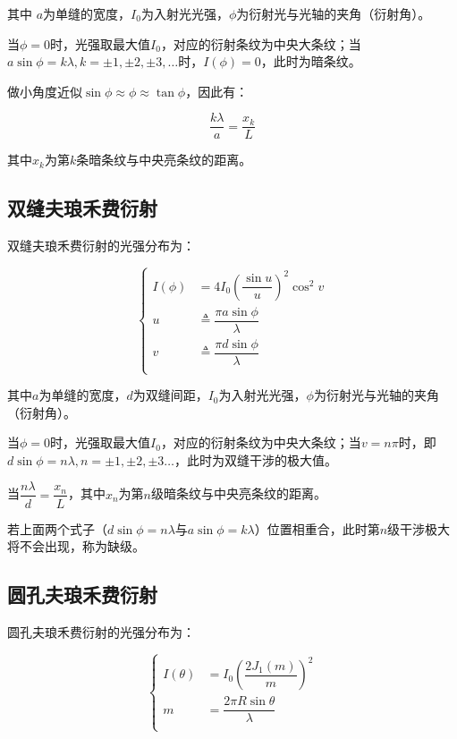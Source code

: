 \documentclass[a4paper]{ltxdoc}
\begin{document}
\begin{multicols}{2}
    其中 $a$为单缝的宽度，$I_0$为入射光光强，$\phi$为衍射光与光轴的夹角（衍射角）。

    当$\phi = 0$时，光强取最大值$I_0$，对应的衍射条纹为中央大条纹；当$a\sin\phi=k\lambda,k=\pm 1,\pm 2,\pm 3,\ldots$时，$I(\phi)=0$，此时为暗条纹。

    做小角度近似$\sin\phi\approx\phi\approx\tan\phi$，因此有：

    $$
        \dfrac{k\lambda}{a} = \dfrac{x_k}{L}
    $$

    其中$x_k$为第$k$条暗条纹与中央亮条纹的距离。

    \subsection{双缝夫琅禾费衍射}

    双缝夫琅禾费衍射的光强分布为：

    $$
        \left\{
        \begin{aligned}
            I(\phi) & = 4I_0 (\dfrac{\sin u}{u})^2 \cos^2 v        \\
            u       & \triangleq \dfrac {\pi a \sin\phi} {\lambda} \\
            v       & \triangleq \dfrac {\pi d \sin\phi} {\lambda} \\
        \end{aligned}
        \right.
    $$

    其中$a$为单缝的宽度，$d$为双缝间距，$I_0$为入射光光强，$\phi$为衍射光与光轴的夹角（衍射角）。

    当$\phi = 0$时，光强取最大值$I_0$，对应的衍射条纹为中央大条纹；当$v=n\pi$时，即$d\sin\phi=n\lambda,n=\pm 1,\pm 2,\pm 3\ldots$，此时为双缝干涉的极大值。

    当$\dfrac{n\lambda}{d} = \dfrac{x_n}{L}$，其中$x_n$为第$n$级暗条纹与中央亮条纹的距离。

    若上面两个式子（$d\sin\phi =n\lambda$与$a\sin\phi =k\lambda$）位置相重合，此时第$n$级干涉极大将不会出现，称为缺级。

    \subsection{圆孔夫琅禾费衍射}

    圆孔夫琅禾费衍射的光强分布为：

    $$
        \left\{
        \begin{aligned}
            I(\theta) & = I_0 (\dfrac{2J_1(m)}{m})^2        \\
            m         & = \dfrac{2\pi R\sin\theta}{\lambda} \\
        \end{aligned}
        \right.
    $$


\end{multicols}
\end{document}
